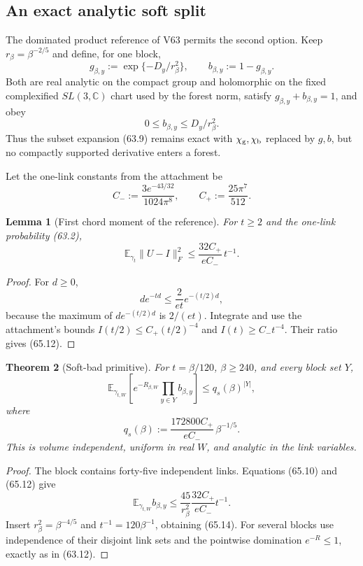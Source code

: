 \documentclass[11pt,oneside]{book}
\newtheorem{theorem}{Theorem}[chapter]
\newtheorem{lemma}[theorem]{Lemma}
\theoremstyle{definition}
\theoremstyle{remark}
\begin{document}
\subsection{An exact analytic soft split}

The dominated product reference of V63 permits the second option.
Keep \(r_\beta=\beta^{-2/5}\) and define, for one block,
\[
 g_{\beta,y}:=\exp\{-D_y/r_\beta^2\},\qquad
 b_{\beta,y}:=1-g_{\beta,y}.                                 \tag{65.9}
\]
Both are real analytic on the compact group and holomorphic on the
fixed complexified \(SL(3,\mathbb C)\) chart used by the forest
norm, satisfy \(g_{\beta,y}+b_{\beta,y}=1\), and obey
\[
                         0\le b_{\beta,y}\le D_y/r_\beta^2. \tag{65.10}
\]
Thus the subset expansion (63.9) remains exact with
\(\chi_{\rm g},\chi_{\rm b}\) replaced by \(g,b\), but no
compactly supported derivative enters a forest.

Let the one-link constants from the attachment be
\[
 C_-:=\frac{3e^{-43/32}}{1024\pi^8},\qquad
 C_+:=\frac{25\pi^7}{512}.                                  \tag{65.11}
\]

\begin{lemma}[First chord moment of the reference]
\label{lem:e8v65-chord-moment}
For \(t\ge2\) and the one-link probability (63.2),
\[
 \mathbb E_{\gamma_t}\|U-I\|_F^2
 \le\frac{32C_+}{eC_-}\,t^{-1}.                             \tag{65.12}
\]
\end{lemma}

\begin{proof}
For \(d\ge0\),
\[
 d e^{-td}
 \le\frac2{et}e^{-(t/2)d},
\]
because the maximum of \(d e^{-(t/2)d}\) is \(2/(et)\).
Integrate and use the attachment's bounds
\(I(t/2)\le C_+(t/2)^{-4}\) and
\(I(t)\ge C_-t^{-4}\).  Their ratio gives (65.12).
\end{proof}

\begin{theorem}[Soft-bad primitive]
\label{thm:e8v65-soft-bad}
For \(t=\beta/120\), \(\beta\ge240\), and every block set \(Y\),
\[
\boxed{
 \mathbb E_{\gamma_{t,W}}
 \left[e^{-R_{\beta,W}}
       \prod_{y\in Y}b_{\beta,y}\right]
 \le q_s(\beta)^{|Y|},}                                     \tag{65.13}
\]
where
\[
 \boxed{
 q_s(\beta):=
 \frac{172800C_+}{eC_-}\,\beta^{-1/5}.}                     \tag{65.14}
\]
This is volume independent, uniform in real \(W\), and analytic in
the link variables.
\end{theorem}

\begin{proof}
The block contains forty-five independent links.  Equations
(65.10) and (65.12) give
\[
 \mathbb E_{\gamma_{t,W}}b_{\beta,y}
 \le\frac{45}{r_\beta^2}
       \frac{32C_+}{eC_-}t^{-1}.
\]
Insert \(r_\beta^2=\beta^{-4/5}\) and
\(t^{-1}=120\beta^{-1}\), obtaining (65.14).
For several blocks use independence of their disjoint link sets and
the pointwise domination \(e^{-R}\le1\), exactly as in (63.12).
\end{proof}
\end{document}
